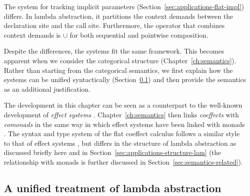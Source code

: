 The system for tracking implicit parameters (Section~\ref{sec:applications-flat-impl})
differs. In lambda abstraction, it partitions the context demands between the
declaration site and the call site. Furthermore, the operator that combines context demands
is $\cup$ for both sequential and pointwise composition.

Despite the differences, the systems fit the same framework. This becomes apparent when
we consider the categorical structure (Chapter~\ref{ch:semantics}). Rather than starting
from the categorical semantics, we first explain how the systems can be unified syntactically
(Section~\ref{sec:flat-calculus-lambda}) and then provide the semantics as an additional
justification.

The development in this chapter can be seen as a counterpart to the well-known development of
\emph{effect systems} \cite{effects-gifford}. Chapter~\ref{ch:semantics} then links \emph{coeffects}
with \emph{comonads} in the same way in which effect systems have been linked with monads
\cite{monad-notions}. The syntax and type system of the flat coeffect calculus follows
a similar style to that of effect systems \cite{effects-polymorphic,effects-talpin-et-al}, but differs
in the structure of lambda abstraction as discussed briefly here and in Section~\ref{sec:applications-structure-lam}
(the relationship with monads is further discussed in Section~\ref{sec:semantics-related}).



\subsection{A unified treatment of lambda abstraction}
\label{sec:flat-calculus-lambda}

